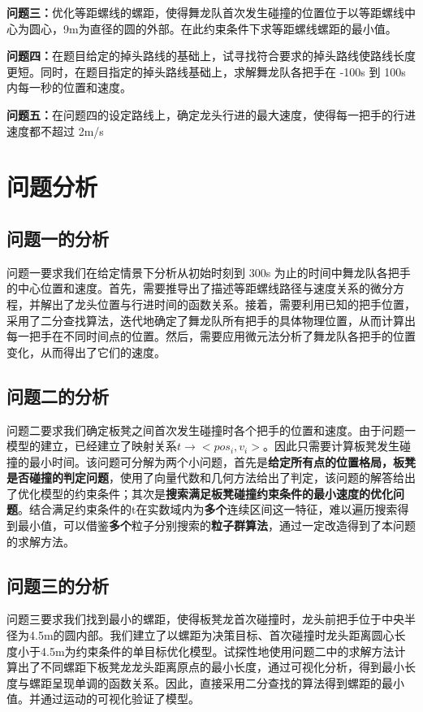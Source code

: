 \documentclass[a4paper]{article}
\begin{document}
		\textbf{问题三：}优化等距螺线的螺距，使得舞龙队首次发生碰撞的位置位于以等距螺线中心为圆心，9m为直径的圆的外部。在此约束条件下求等距螺线螺距的最小值。

		\textbf{问题四：}在题目给定的掉头路线的基础上，试寻找符合要求的掉头路线使路线长度更短。同时，在题目指定的掉头路线基础上，求解舞龙队各把手在 -100s 到 100s 内每一秒的位置和速度。

		\textbf{问题五：}在问题四的设定路线上，确定龙头行进的最大速度，使得每一把手的行进速度都不超过 2m/s

	\section{问题分析}
	\subsection{问题一的分析}
		问题一要求我们在给定情景下分析从初始时刻到 300s 为止的时间中舞龙队各把手的中心位置和速度。首先，需要推导出了描述等距螺线路径与速度关系的微分方程，并解出了龙头位置与行进时间的函数关系。接着，需要利用已知的把手位置，采用了二分查找算法，迭代地确定了舞龙队所有把手的具体物理位置，从而计算出每一把手在不同时间点的位置。然后，需要应用微元法分析了舞龙队各把手的位置变化，从而得出了它们的速度。
	\subsection{问题二的分析}
        问题二要求我们确定板凳之间首次发生碰撞时各个把手的位置和速度。由于问题一模型的建立，已经建立了映射关系$t\to<pos_i,v_i>$。因此只需要计算板凳发生碰撞的最小时间。该问题可分解为两个小问题，首先是\textbf{给定所有点的位置格局，板凳是否碰撞的判定问题}，使用了向量代数和几何方法给出了判定，该问题的解答给出了优化模型的约束条件；其次是\textbf{搜索满足板凳碰撞约束条件的最小速度的优化问题}。结合满足约束条件的t在实数域内为\textbf{多个}连续区间这一特征，难以遍历搜索得到最小值，可以借鉴\textbf{多个}粒子分别搜索的\textbf{粒子群算法}，通过一定改造得到了本问题的求解方法。
	\subsection{问题三的分析}
        问题三要求我们找到最小的螺距，使得板凳龙首次碰撞时，龙头前把手位于中央半径为4.5m的圆内部。我们建立了以螺距为决策目标、首次碰撞时龙头距离圆心长度小于4.5m为约束条件的单目标优化模型。试探性地使用问题二中的求解方法计算出了不同螺距下板凳龙龙头距离原点的最小长度，通过可视化分析，得到最小长度与螺距呈现单调的函数关系。因此，直接采用二分查找的算法得到螺距的最小值。并通过运动的可视化验证了模型。
\end{document}
